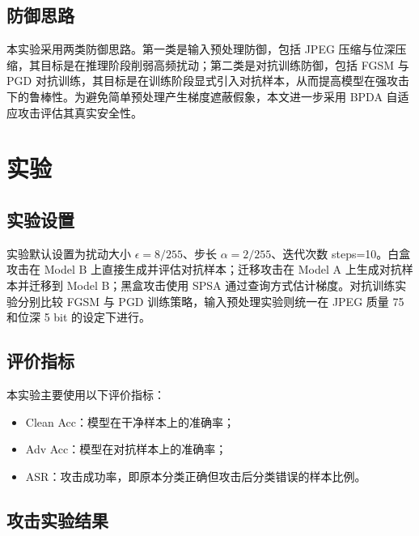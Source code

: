 \documentclass[UTF8,a4paper,12pt]{ctexart}
\begin{document}
\subsection{防御思路}

本实验采用两类防御思路。第一类是输入预处理防御，包括 JPEG 压缩与位深压缩，其目标是在推理阶段削弱高频扰动；第二类是对抗训练防御，包括 FGSM 与 PGD 对抗训练，其目标是在训练阶段显式引入对抗样本，从而提高模型在强攻击下的鲁棒性。为避免简单预处理产生梯度遮蔽假象，本文进一步采用 BPDA 自适应攻击评估其真实安全性。

\section{实验}

\subsection{实验设置}

实验默认设置为扰动大小 $\epsilon=8/255$、步长 $\alpha=2/255$、迭代次数 steps=10。白盒攻击在 Model B 上直接生成并评估对抗样本；迁移攻击在 Model A 上生成对抗样本并迁移到 Model B；黑盒攻击使用 SPSA 通过查询方式估计梯度。对抗训练实验分别比较 FGSM 与 PGD 训练策略，输入预处理实验则统一在 JPEG 质量 75 和位深 5 bit 的设定下进行。

\subsection{评价指标}

本实验主要使用以下评价指标：

\begin{itemize}
    \item Clean Acc：模型在干净样本上的准确率；
    \item Adv Acc：模型在对抗样本上的准确率；
    \item ASR：攻击成功率，即原本分类正确但攻击后分类错误的样本比例。
\end{itemize}

\subsection{攻击实验结果}
\end{document}
